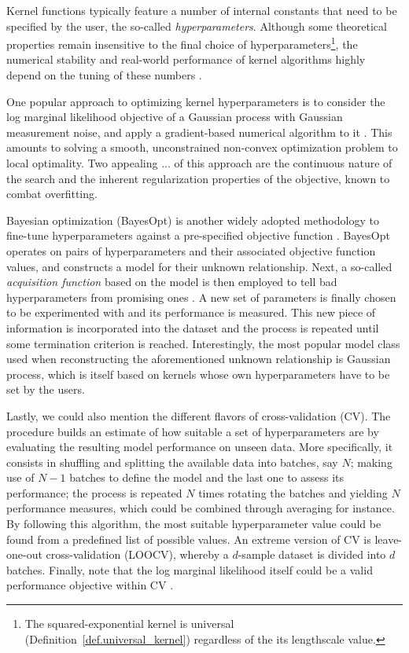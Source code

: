 Kernel functions typically feature a number of internal constants that need to be specified by the user, the so-called \textit{hyperparameters}. Although some theoretical properties remain insensitive to the final choice of hyperparameters\footnote{The squared-exponential kernel is universal (Definition~\ref{def.universal_kernel}) regardless of the its lengthscale value.}, the numerical stability and real-world performance of kernel algorithms highly depend on the tuning of these numbers \citep{fasshauer2011positive}. 

One popular approach to optimizing kernel hyperparameters is to consider the log marginal likelihood objective of a Gaussian process with Gaussian measurement noise, and apply a gradient-based numerical algorithm to it \citep[§5.4.1]{williams2006gaussian}. This amounts to solving a smooth, unconstrained non-convex optimization problem to local optimality.  Two appealing ... of this approach are the continuous nature of the search and the inherent regularization properties of the objective, known to combat overfitting. 

Bayesian optimization (BayesOpt) is another widely adopted methodology to fine-tune hyperparameters against a pre-specified objective function \citep{snoek2012practical,shahriari2015taking}. BayesOpt operates on pairs of hyperparameters and their associated objective function values, and constructs a model for their unknown relationship. Next, a so-called \textit{acquisition function} based on the model is then employed to tell bad hyperparameters from promising ones \citep{wilson2018maximizing}. A new set of parameters is finally chosen to be experimented with and its performance is measured. This new piece of information is incorporated into the dataset and the process is repeated until some termination criterion is reached. Interestingly, the most popular model class used when reconstructing the aforementioned unknown relationship is Gaussian process, which is itself based on kernels whose own hyperparameters have to be set by the users.

Lastly, we could also mention the different flavors of cross-validation (CV). The procedure builds an estimate of how suitable a set of hyperparameters are by evaluating the resulting model performance on unseen data. More specifically, it consists in shuffling and splitting the available data into batches, say $N$; making use of $N-1$ batches to define the model and the last one to assess its performance; the process is repeated $N$ times rotating the batches and yielding $N$ performance measures, which could be combined through averaging for instance. By following this algorithm, the most suitable hyperparameter value could be found from a predefined list of possible values. An extreme version of CV is leave-one-out cross-validation (LOOCV), whereby a $d$-sample dataset is divided into $d$ batches. Finally, note that the log marginal likelihood itself could be a valid performance objective within CV \citep[§5.4.2]{williams2006gaussian}.

